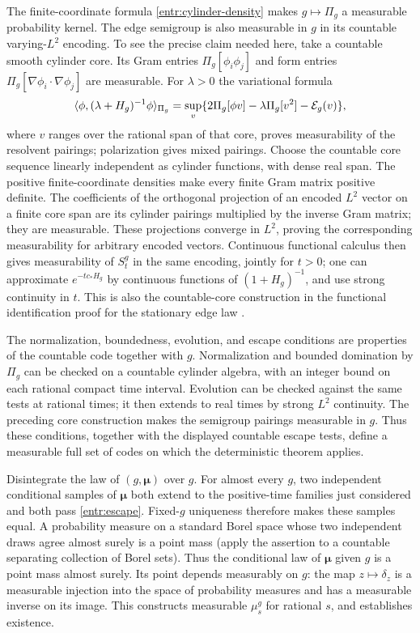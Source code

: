 The finite-coordinate formula \eqref{entr:cylinder-density} makes
\(g\mapsto\Pi_g\) a measurable probability kernel.  The edge
semigroup is also measurable in \(g\) in its countable varying-\(L^2\)
encoding.  To see the precise claim needed here, take a countable
smooth cylinder core.  Its Gram entries \(\Pi_g[\phi_i\phi_j]\) and
form entries \(\Pi_g[\nabla\phi_i\cdot\nabla\phi_j]\) are measurable.
For \(\lambda>0\) the variational formula
\[
 \langle\phi,(\lambda+H_g)^{-1}\phi\rangle_{\Pi_g}
 =\sup_v\{2\Pi_g[\phi v]-\lambda\Pi_g[v^2]-\mathcal E_g(v)\},
\]
where \(v\) ranges over the rational span of that core, proves
measurability of the resolvent pairings; polarization gives mixed
pairings.  Choose the countable core sequence linearly independent
as cylinder functions, with dense real span.  The positive
finite-coordinate densities make every finite Gram matrix positive
definite.  The coefficients of the orthogonal projection of an encoded
\(L^2\) vector on a finite core span are its cylinder pairings
multiplied by the inverse Gram matrix; they are measurable.
These projections converge in \(L^2\), proving the corresponding
measurability for arbitrary encoded vectors.  Continuous functional
calculus then gives measurability of \(S_t^g\) in the same encoding,
jointly for \(t>0\); one can approximate \(e^{-tc_*H_g}\) by continuous
functions of \((1+H_g)^{-1}\), and use strong continuity in \(t\).
This is also the countable-core construction in the functional
identification proof for the stationary edge law
\cite[proof of Proposition~9.2]{FUA}.

The normalization, boundedness, evolution, and escape conditions are
properties of the countable code together with \(g\).
Normalization and bounded domination by \(\Pi_g\) can be checked on
a countable cylinder algebra, with an integer bound on each rational
compact time interval.  Evolution can be checked against the same
tests at rational times; it then extends to real times by strong
\(L^2\) continuity.  The preceding core construction makes the semigroup
pairings measurable in \(g\).  Thus these conditions, together with
the displayed countable escape tests, define a measurable full set
of codes on which the deterministic theorem applies.

Disintegrate the law of \((g,\boldsymbol\mu)\) over \(g\).
For almost every \(g\), two independent conditional samples of
\(\boldsymbol\mu\) both extend to the positive-time families just
considered and both pass \eqref{entr:escape}.  Fixed-\(g\) uniqueness
therefore makes these samples equal.  A probability measure on a
standard Borel space whose two independent draws agree almost surely
is a point mass (apply the assertion to a countable separating
collection of Borel sets).  Thus the conditional law of
\(\boldsymbol\mu\) given \(g\) is a point mass almost surely.
Its point depends measurably on \(g\): the map
\(z\mapsto\delta_z\) is a measurable injection into the space of
probability measures and has a measurable inverse on its image.
This constructs measurable \(\mu_s^g\) for rational \(s\), and
establishes existence.

